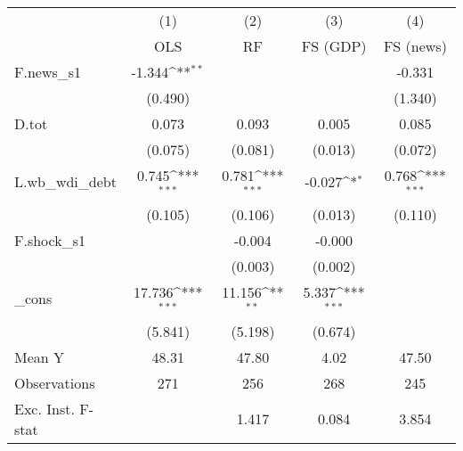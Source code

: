 {
\def\sym#1{\ifmmode^{#1}\else\(^{#1}\)\fi}
\begin{tabular}{l*{4}{c}}
\toprule
            &\multicolumn{1}{c}{(1)}&\multicolumn{1}{c}{(2)}&\multicolumn{1}{c}{(3)}&\multicolumn{1}{c}{(4)}\\
            &\multicolumn{1}{c}{OLS}&\multicolumn{1}{c}{RF}&\multicolumn{1}{c}{FS (GDP)}&\multicolumn{1}{c}{FS (news)}\\
\midrule
F.news\_s1   &      -1.344\sym{**} &                     &                     &      -0.331         \\
            &     (0.490)         &                     &                     &     (1.340)         \\
\addlinespace
D.tot       &       0.073         &       0.093         &       0.005         &       0.085         \\
            &     (0.075)         &     (0.081)         &     (0.013)         &     (0.072)         \\
\addlinespace
L.wb\_wdi\_debt&       0.745\sym{***}&       0.781\sym{***}&      -0.027\sym{*}  &       0.768\sym{***}\\
            &     (0.105)         &     (0.106)         &     (0.013)         &     (0.110)         \\
\addlinespace
F.shock\_s1  &                     &      -0.004         &      -0.000         &                     \\
            &                     &     (0.003)         &     (0.002)         &                     \\
\addlinespace
\_cons      &      17.736\sym{***}&      11.156\sym{**} &       5.337\sym{***}&                     \\
            &     (5.841)         &     (5.198)         &     (0.674)         &                     \\
\midrule
Mean Y      &       48.31         &       47.80         &        4.02         &       47.50         \\
Observations&         271         &         256         &         268         &         245         \\
Exc. Inst. F-stat&                     &       1.417         &       0.084         &       3.854         \\
\bottomrule
\end{tabular}
}
